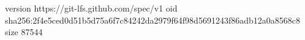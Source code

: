 version https://git-lfs.github.com/spec/v1
oid sha256:2f4e5ced0d51b5d75a6f7c84242da2979f64f98d5691243f86adb12a0a8568c8
size 87544
